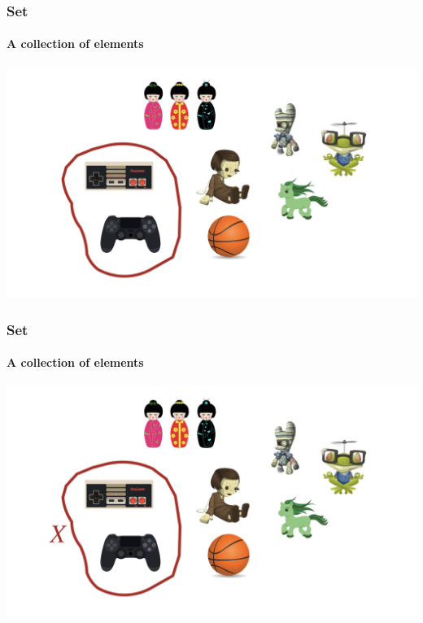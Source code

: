 \documentclass[fleqn,10pt,serif,xcolor=svgnames,xcolor=table,aspectratio=169,handout]{beamer}
\begin{document}
\begin{frame}
  \frametitle{Set}
  \framesubtitle{A collection of elements}

  \begin{center}
    \includegraphics[width=\textwidth]{01a-sets-elements-cardinality/01a-sets-elements-cardinality-002.jpeg}
  \end{center}

\end{frame}

\begin{frame}
  \frametitle{Set}
  \framesubtitle{A collection of elements}

  \begin{center}
    \includegraphics[width=\textwidth]{01a-sets-elements-cardinality/01a-sets-elements-cardinality-003.jpeg}
  \end{center}

\end{frame}
\end{document}
